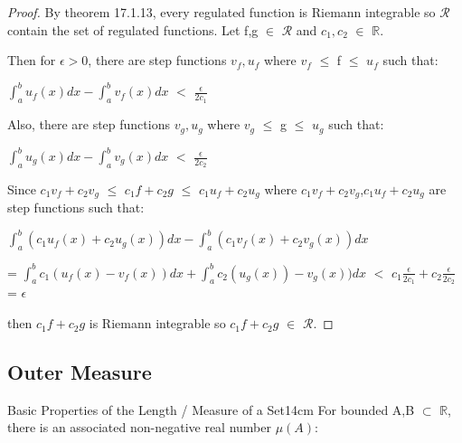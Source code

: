     \begin{proof}
        By {\color{red} theorem 17.1.13}, every regulated function
        is Riemann integrable so $\mathcal{R}$
        contain the set of regulated functions.
        Let f,g $\in$ $\mathcal{R}$ and $c_1,c_2$ $\in$ $\mathbb{R}$.
        
        Then for $\epsilon > 0$, there are step functions $v_f,u_f$ where
        $v_f$ $\leq$ f $\leq$ $u_f$ such that:

        \hspace{0.5cm}
        $\int_a^b u_f(x) dx - \int_a^b v_f(x) dx$ $<$ $\frac{\epsilon}{2c_1}$

        Also, there are step functions $v_g,u_g$ where
        $v_g$ $\leq$ g $\leq$ $u_g$ such that:

        \hspace{0.5cm}
        $\int_a^b u_g(x) dx - \int_a^b v_g(x) dx$ $<$ $\frac{\epsilon}{2c_2}$

        Since $c_1v_f + c_2v_g$
        $\leq$ $c_1f + c_2g$
        $\leq$ $c_1u_f + c_2u_g$
        where $c_1v_f + c_2v_g$,$c_1u_f + c_2u_g$ are step functions such that:

        \hspace{0.5cm}
        $\int_a^b (c_1u_f(x) + c_2u_g(x)) dx
            - \int_a^b (c_1v_f(x) + c_2v_g(x)) dx$

        \hspace{0.5cm}
        = $\int_a^b c_1(u_f(x) - v_f(x)) dx
            + \int_a^b c_2(u_g(x)) - v_g(x)) dx$
        $<$ $c_1\frac{\epsilon}{2c_1} + c_2\frac{\epsilon}{2c_2}$
        = $\epsilon$

        then $c_1f + c_2g$ is Riemann integrable so
        $c_1f + c_2g$ $\in$ $\mathcal{R}$.
    \end{proof}

    \vspace{0.5cm}





\subsection{ Outer Measure }

    \begin{definition}{Basic Properties of the Length / Measure of a Set}{14cm}
        For bounded A,B $\subset$ $\mathbb{R}$, there is an associated
        non-negative real number $\mu(A)$:
    \end{definition}

